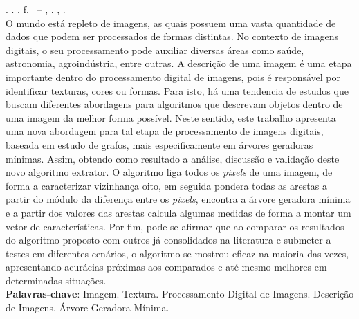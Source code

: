 
\begin{resumo}[RESUMO]
\begin{SingleSpacing}

\imprimirautorcitacao. \imprimirtitulo. \imprimirdata. \pageref {LastPage} f. \imprimirprojeto\ – \imprimirprograma, \imprimirinstituicao. \imprimirlocal, \imprimirdata.\\

O mundo está repleto de imagens, as quais possuem uma vasta quantidade de dados que podem ser processados de formas distintas. No contexto de imagens digitais, o seu processamento pode auxiliar diversas áreas como saúde, astronomia, agroindústria, entre outras. A descrição de uma imagem é uma etapa importante dentro do processamento digital de imagens, pois é responsável por identificar texturas, cores ou formas. Para isto, há uma tendencia de estudos que buscam diferentes abordagens para algoritmos que descrevam objetos dentro de uma imagem da melhor forma possível. Neste sentido, este trabalho apresenta uma nova abordagem para tal etapa de processamento de imagens digitais, baseada em estudo de grafos, mais especificamente em árvores geradoras mínimas. Assim, obtendo como resultado a análise, discussão e validação deste novo algoritmo extrator. O algoritmo liga todos os \textit{pixels} de uma imagem, de forma a caracterizar vizinhança oito, em seguida pondera todas as arestas a partir do módulo da diferença entre os \textit{pixels}, encontra a árvore geradora mínima e a partir dos valores das arestas calcula algumas medidas de forma a montar um vetor de características. Por fim, pode-se afirmar que ao comparar os resultados do algoritmo proposto com outros já consolidados na literatura e submeter a testes em diferentes cenários, o algoritmo se mostrou eficaz na maioria das vezes, apresentando acurácias próximas aos comparados e até mesmo melhores em determinadas situações.
\\

\textbf{Palavras-chave}: Imagem.  Textura. Processamento Digital de Imagens. Descrição de Imagens. Árvore Geradora Mínima.

\end{SingleSpacing}
\end{resumo}

